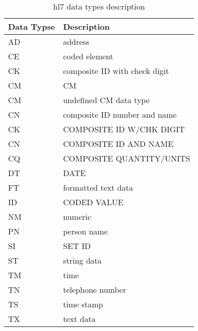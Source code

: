 \documentclass[a4paper,12pt]{article}
\begin{document}
\begin{table}[h]
\centering
\caption{hl7 data types description}
    \begin{tabu} to \textwidth {|X[] | X[]|}
    \toprule
        \textbf{Data Typse} & \textbf{Description}\\
    \midrule   
        AD	& address	\\
        CE	& coded element	\\
        CK	& composite ID with check digit	\\
        CM	& CM	\\
        CM	& undefined CM data type\\	
        CN	& composite ID number and name	\\
        CK	& COMPOSITE ID W/CHK DIGIT	\\
        CN	& COMPOSITE ID AND NAME	\\
        CQ	& COMPOSITE QUANTITY/UNITS	\\
        DT	& DATE	\\
        FT	& formatted text data	\\
        ID	& CODED VALUE	\\
        NM	& numeric	\\
        PN	& person name	\\
        SI	& SET ID\\	
        ST	& string data	\\
        TM	& time	\\
        TN	& telephone number\\
        TS	& time stamp	\\
        TX	& text data	\\
    \bottomrule
    \end{tabu}
\end{table}
    
\end{document}

